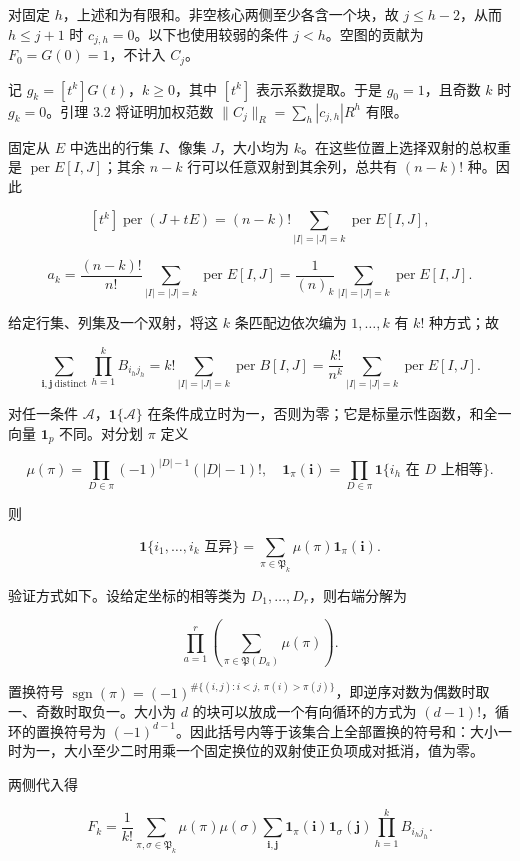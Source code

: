 \documentclass[11pt,a4paper]{article}
\begin{document}
对固定 \(h\)，上述和为有限和。非空核心两侧至少各含一个块，故 \(j\le h-2\)，从而 \(h\le j+1\) 时 \(c_{j,h}=0\)。以下也使用较弱的条件 \(j<h\)。空图的贡献为 \(F_0=G(0)=1\)，不计入 \(C_j\)。

记 \(g_k=[t^k]G(t)\)，\(k\ge0\)，其中 \([t^k]\) 表示系数提取。于是 \(g_0=1\)，且奇数 \(k\) 时 \(g_k=0\)。引理 3.2 将证明加权范数 \(\|C_j\|_R=\sum_h|c_{j,h}|R^h\) 有限。

固定从 \(E\) 中选出的行集 \(I\)、像集 \(J\)，大小均为 \(k\)。在这些位置上选择双射的总权重是 \(\operatorname{per}E[I,J]\)；其余 \(n-k\) 行可以任意双射到其余列，总共有 \((n-k)!\) 种。因此

\[
[t^k]\operatorname{per}(J+tE)
=(n-k)!\sum_{|I|=|J|=k}\operatorname{per}E[I,J],
\]

\[
a_k=\frac{(n-k)!}{n!}\sum_{|I|=|J|=k}\operatorname{per}E[I,J]
=\frac1{(n)_k}\sum_{|I|=|J|=k}\operatorname{per}E[I,J].
\]

给定行集、列集及一个双射，将这 \(k\) 条匹配边依次编为 \(1,\ldots,k\) 有 \(k!\) 种方式；故

\[
\sum_{\boldsymbol i,\boldsymbol j\ \mathrm{distinct}}\prod_{h=1}^kB_{i_hj_h}
=k!\sum_{|I|=|J|=k}\operatorname{per}B[I,J]
=\frac{k!}{n^k}\sum_{|I|=|J|=k}\operatorname{per}E[I,J].
\]

对任一条件 \(\mathcal A\)，\(\mathbf1\{\mathcal A\}\) 在条件成立时为一，否则为零；它是标量示性函数，和全一向量 \(\mathbf1_p\) 不同。对分划 \(\pi\) 定义

\[
\mu(\pi)=\prod_{D\in\pi}(-1)^{|D|-1}(|D|-1)!,\quad
\mathbf1_\pi(\boldsymbol i)=\prod_{D\in\pi}\mathbf1\{i_h\text{ 在 }D\text{ 上相等}\}.
\]

则

\[
\mathbf1\{i_1,\ldots,i_k\text{ 互异}\}
=\sum_{\pi\in\mathfrak P_k}\mu(\pi)\mathbf1_\pi(\boldsymbol i).
\]

验证方式如下。设给定坐标的相等类为 \(D_1,\ldots,D_r\)，则右端分解为

\[
\prod_{a=1}^r\left(\sum_{\pi\in\mathfrak P(D_a)}\mu(\pi)\right).
\]

置换符号 \(\operatorname{sgn}(\pi)=(-1)^{\#\{(i,j):i<j,\ \pi(i)>\pi(j)\}}\)，即逆序对数为偶数时取一、奇数时取负一。大小为 \(d\) 的块可以放成一个有向循环的方式为 \((d-1)!\)，循环的置换符号为 \((-1)^{d-1}\)。因此括号内等于该集合上全部置换的符号和：大小一时为一，大小至少二时用乘一个固定换位的双射使正负项成对抵消，值为零。

两侧代入得

\[
F_k=\frac1{k!}\sum_{\pi,\sigma\in\mathfrak P_k}\mu(\pi)\mu(\sigma)
\sum_{\boldsymbol i,\boldsymbol j}\mathbf1_\pi(\boldsymbol i)\mathbf1_\sigma(\boldsymbol j)
\prod_{h=1}^kB_{i_hj_h}.
\]
\end{document}
